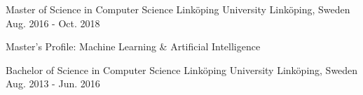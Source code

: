

\begin{cventries}

  \cventry
    {Master of Science in Computer Science} %
    {Linköping University} %
    {Linköping, Sweden} %
    {Aug. 2016 - Oct. 2018} %
    {
      \begin{cvitems} %
        \item {Master's Profile: Machine Learning \& Artificial Intelligence}
      \end{cvitems}
    }

  \cventry
    {Bachelor of Science in Computer Science} %
    {Linköping University} %
    {Linköping, Sweden} %
    {Aug. 2013 - Jun. 2016} %
    {}

\end{cventries}
